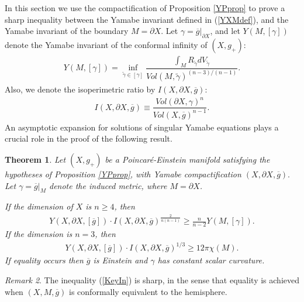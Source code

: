 \documentclass{amsart}
\newtheorem{theorem}{Theorem}[section]
\theoremstyle{definition}
\theoremstyle{remark}
\newtheorem{remark}[theorem]{Remark}
\numberwithin{equation}{section}
\begin{document}
In this section we use the compactification of Proposition \ref{YPprop}
to prove a sharp inequality between the Yamabe invariant defined in (\ref{YXMdef}), and the Yamabe invariant of the boundary $M = \partial X$.  Let
$\gamma = \overline{g}\big|_{\partial X}$, and let $Y(M,[\gamma])$ denote the Yamabe invariant of the conformal infinity of $(X,g_{+})$:
\begin{align} \label{YMdef}
Y(M,[\gamma]) = \inf_{\tilde{\gamma} \in [\gamma]} \dfrac{ \int_M R_{\tilde{\gamma}} dV_{\tilde{\gamma}}}{Vol(M,\tilde{\gamma})^{(n-3)/(n-1)}}.
\end{align}
Also, we denote the isoperimetric ratio by $I(X,\partial X, \overline{g})$:
\begin{align*} %
I(X,\partial X, \overline{g}) \equiv \dfrac{ Vol(\partial X, \gamma)^n}{ Vol(X, \overline{g})^{n-1}}.
\end{align*}
An asymptotic expansion for solutions of singular Yamabe equations plays a crucial role in the proof of the following result.


\begin{theorem}  \label{MainThm1} Let $(X,g_{+})$ be a Poincar\'e-Einstein manifold satisfying the hypotheses of Proposition \ref{YPprop}, with Yamabe compactification $(X,\partial X, \overline{g}).$  Let $\gamma = \overline{g}|_{M}$ denote the induced metric, where $M = \partial X$.

If the dimension of $X$ is $n \geq 4$, then
\begin{align} \label{KeyIn}
Y(X,\partial X ,[\overline{g}]) \cdot I(X,\partial X, \overline{g})^{\frac{2}{n(n-1)}} \geq \frac{n}{n-2} Y(M,[\gamma]).
\end{align}
If the dimension is $n = 3$, then
\begin{align} \label{2d}
Y(X,\partial X,[\overline{g}]) \cdot I(X,\partial X, \overline{g})^{1/3} \geq 12 \pi \chi(M).
\end{align}
If equality occurs then $\overline{g}$ is Einstein and $\gamma$ has constant scalar curvature.
\end{theorem}



\begin{remark}  The inequality (\ref{KeyIn}) is sharp, in the sense that equality is achieved when $(X,M,\overline{g})$ is conformally equivalent to the hemisphere.
\end{remark}
\end{document}
